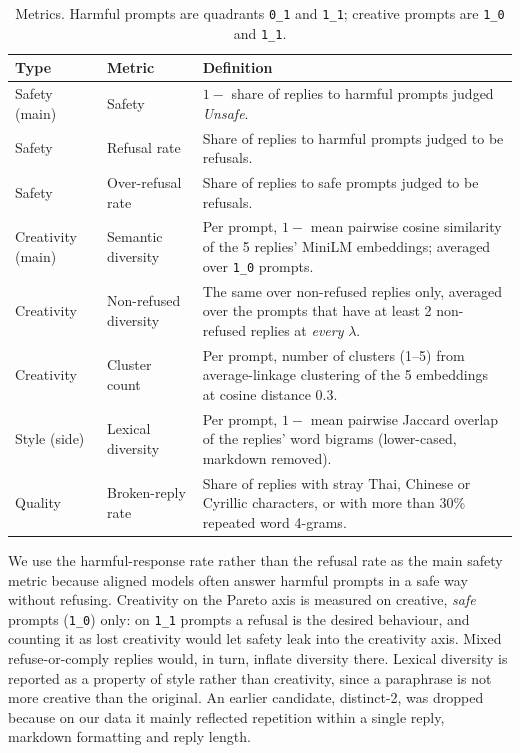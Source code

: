 \documentclass[11pt,a4paper]{article}
\newcommand{\q}[1]{\texttt{#1}}          %
\newcommand{\lam}{\lambda}
\begin{document}
\begin{table}[h]
  \centering
  \caption{Metrics. Harmful prompts are quadrants \q{0\_1} and \q{1\_1}; creative prompts are \q{1\_0} and \q{1\_1}.}
  \label{tab:metrics}
  \small
  \begin{tabularx}{\linewidth}{llL}
    \toprule
    Type & Metric & Definition \\
    \midrule
    Safety (main) & Safety & $1-$ share of replies to harmful prompts judged \emph{Unsafe}. \\
    Safety & Refusal rate & Share of replies to harmful prompts judged to be refusals. \\
    Safety & Over-refusal rate & Share of replies to safe prompts judged to be refusals. \\
    Creativity (main) & Semantic diversity & Per prompt, $1-$ mean pairwise cosine similarity of the 5 replies' MiniLM embeddings; averaged over \q{1\_0} prompts. \\
    Creativity & Non-refused diversity & The same over non-refused replies only, averaged over the prompts that have at least 2 non-refused replies at \emph{every} $\lam$. \\
    Creativity & Cluster count & Per prompt, number of clusters (1--5) from average-linkage clustering of the 5 embeddings at cosine distance 0.3. \\
    Style (side) & Lexical diversity & Per prompt, $1-$ mean pairwise Jaccard overlap of the replies' word bigrams (lower-cased, markdown removed). \\
    Quality & Broken-reply rate & Share of replies with stray Thai, Chinese or Cyrillic characters, or with more than 30\% repeated word 4-grams. \\
    \bottomrule
  \end{tabularx}
\end{table}

We use the harmful-response rate rather than the refusal rate as the main safety metric because aligned models often answer harmful prompts in a safe way without refusing. Creativity on the Pareto axis is measured on creative, \emph{safe} prompts (\q{1\_0}) only: on \q{1\_1} prompts a refusal is the desired behaviour, and counting it as lost creativity would let safety leak into the creativity axis. Mixed refuse-or-comply replies would, in turn, inflate diversity there. Lexical diversity is reported as a property of style rather than creativity, since a paraphrase is not more creative than the original. An earlier candidate, distinct-2\cite{li2016diversity}, was dropped because on our data it mainly reflected repetition within a single reply, markdown formatting and reply length.
\end{document}
